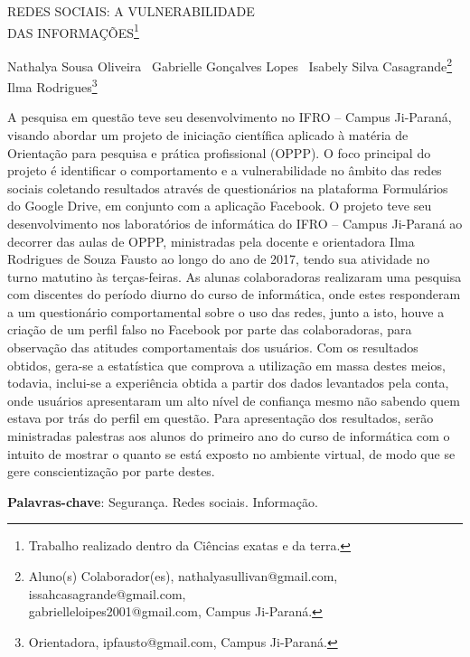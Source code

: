\documentclass[article,12pt,onesidea,4paper,english,brazil]{abntex2}
\begin{document}
	
	
	\frenchspacing 
	
	\begin{center}
		\LARGE REDES SOCIAIS: A VULNERABILIDADE\\DAS INFORMAÇÕES\footnote{Trabalho realizado dentro da Ciências exatas e da terra.}
		
		\normalsize
		Nathalya Sousa Oliveira \, Gabrielle Gonçalves Lopes \, Isabely Silva Casagrande\footnote{Aluno(s) Colaborador(es), nathalyasullivan@gmail.com, issahcasagrande@gmail.com,\\gabrielleloipes2001@gmail.com, Campus Ji-Paraná.} 
	Ilma Rodrigues\footnote{Orientadora, ipfausto@gmail.com, Campus Ji-Paraná.} 

	\end{center}
	
	\noindent A pesquisa em questão teve seu desenvolvimento no IFRO – Campus Ji-Paraná,
	visando abordar um projeto de iniciação científica aplicado à matéria de Orientação
	para pesquisa e prática profissional (OPPP). O foco principal do projeto é identificar
	o comportamento e a vulnerabilidade no âmbito das redes sociais coletando
	resultados através de questionários na plataforma Formulários do Google Drive, em
	conjunto com a aplicação Facebook. O projeto teve seu desenvolvimento nos
	laboratórios de informática do IFRO – Campus Ji-Paraná ao decorrer das aulas de
	OPPP, ministradas pela docente e orientadora Ilma Rodrigues de Souza Fausto ao
	longo do ano de 2017, tendo sua atividade no turno matutino às terças-feiras. As
	alunas colaboradoras realizaram uma pesquisa com discentes do período diurno do
	curso de informática, onde estes responderam a um questionário comportamental
	sobre o uso das redes, junto a isto, houve a criação de um perfil falso no Facebook
	por parte das colaboradoras, para observação das atitudes comportamentais dos
	usuários. Com os resultados obtidos, gera-se a estatística que comprova a utilização
	em massa destes meios, todavia, inclui-se a experiência obtida a partir dos dados
	levantados pela conta, onde usuários apresentaram um alto nível de confiança
	mesmo não sabendo quem estava por trás do perfil em questão. Para apresentação
	dos resultados, serão ministradas palestras aos alunos do primeiro ano do curso de
	informática com o intuito de mostrar o quanto se está exposto no ambiente virtual, de
	modo que se gere conscientização por parte destes.
	
	\vspace{\onelineskip}
	
	\noindent
	\textbf{Palavras-chave}: Segurança. Redes sociais. Informação.
	
\end{document}
